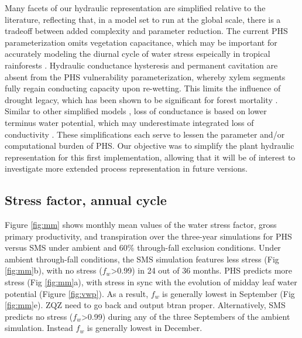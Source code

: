 \documentclass[draft,linenumbers]{agujournal}
\begin{document}
    Many facets of our hydraulic representation are simplified relative to the literature, reflecting that, in a model set to run at the global scale, 
    there is a tradeoff between added complexity and parameter reduction.
    The current PHS parameterization omits vegetation capacitance, 
    which may be important for accurately modeling the diurnal cycle of water stress espeically in tropical rainforests \citep{meinzer2009}.
    Hydraulic conductance hysteresis and permanent cavitation are absent from the PHS vulnerability parameterization, 
    whereby xylem segments fully regain conducting capacity upon re-wetting.
    This limits the influence of drought legacy, which has been shown to be significant for forest mortality \citep{anderegg2013}.
    Similar to other simplified models \citep{xu2016}, loss of conductance is based on lower terminus water potential, 
    which may underestimate integrated loss of conductivity \citep{sperry2015}.
    These simplifications each serve to lessen the parameter and/or computational burden of PHS.
    Our objective was to simplify the plant hydraulic representation for this first implementation, 
    allowing that it will be of interest to investigate more extended process representation in future versions.

\subsection{Stress factor, annual cycle}
    
    Figure \ref{fig:mm} shows monthly mean values of the water stress factor, gross primary productivity, and transpiration
    over the three-year simulations for PHS versus SMS under ambient and 60\% through-fall exclusion conditions.
    Under ambient through-fall conditions, the SMS simulation features less stress (Fig \ref{fig:mm}b), with
    no stress ($f_w$>0.99) in 24 out of 36 months.
    PHS predicts more stress (Fig \ref{fig:mm}a), with stress in sync with the evolution of midday leaf water potential (Figure \ref{fig:vwp}).
    As a result, $f_w$ is generally lowest in September (Fig \ref{fig:mm}e). ZQZ need to go back and output btran proper.
    Alternatively, SMS predicts no stress ($f_w$>0.99) during any of the three Septembers of the ambient simulation.
    Instead $f_w$ is generally lowest in December.
    
\end{document}
